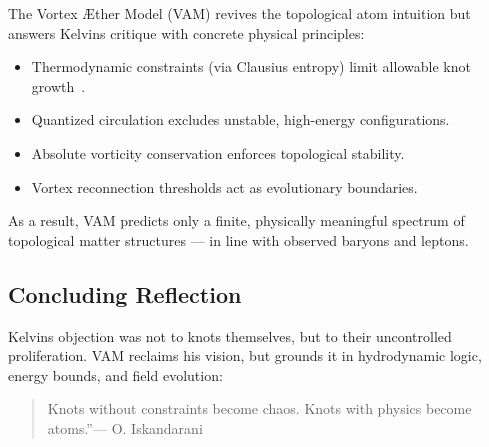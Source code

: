 The Vortex Æther Model (VAM) revives the topological atom intuition but answers Kelvin\rqs s critique with concrete physical principles:

\begin{itemize}
  \item Thermodynamic constraints (via Clausius entropy) limit allowable knot growth~\cite{clausius1865entropy}.
  \item Quantized circulation excludes unstable, high-energy configurations.
  \item Absolute vorticity conservation enforces topological stability.
  \item Vortex reconnection thresholds act as evolutionary boundaries.
\end{itemize}

As a result, VAM predicts only a finite, physically meaningful spectrum of topological matter structures — in line with observed baryons and leptons.

\subsection*{Concluding Reflection}

Kelvin\rqs s objection was not to knots themselves, but to their uncontrolled proliferation. VAM reclaims his vision, but grounds it in hydrodynamic logic, energy bounds, and field evolution:

\begin{quote}
\grqq Knots without constraints become chaos. Knots with physics become atoms.\textquotedblright — O. Iskandarani
\end{quote}

